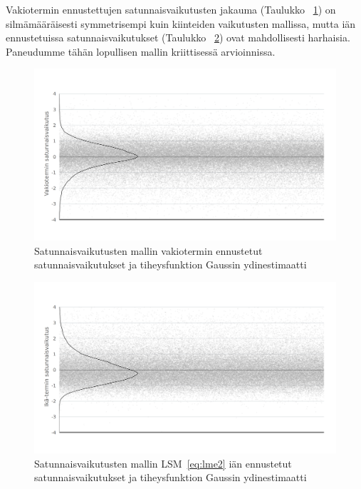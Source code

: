 \documentclass[finnish]{docopts}
\begin{document}
Vakiotermin ennustettujen satunnaisvaikutusten jakauma (Taulukko ~\ref{fig:lme2_vakio_ranef}) on silmämääräisesti symmetrisempi kuin kiinteiden vaikutusten mallissa, mutta iän ennustetuissa satunnaisvaikutukset (Taulukko ~\ref{fig:lme2_ika_ranef}) ovat mahdollisesti harhaisia. Paneudumme tähän lopullisen mallin kriittisessä arvioinnissa.\\

\begin{figure}[H]
\centering
  \includegraphics[scale=0.8]{kuvaajat/lme2_vakio_satunnaisvaikutukset.png}
  \caption{Satunnaisvaikutusten mallin vakiotermin ennustetut satunnaisvaikutukset ja tiheysfunktion Gaussin ydinestimaatti}
  \label{fig:lme2_vakio_ranef}
\end{figure}

\begin{figure}[H]
\centering
  \includegraphics[scale=0.8]{kuvaajat/lme2_ika_satunnaisvaikutukset.png}
  \caption{Satunnaisvaikutusten mallin LSM~\ref{eq:lme2} iän ennustetut satunnaisvaikutukset ja tiheysfunktion Gaussin ydinestimaatti}
  \label{fig:lme2_ika_ranef}
\end{figure}
\end{document}
